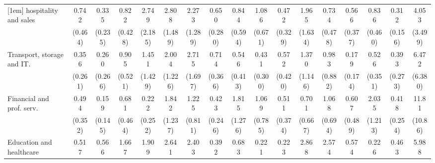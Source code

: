 {\begin{tabular}{l*{16}{c}}
[1em]
hospitality and sales&       0.742         &       0.335         &       0.822         &       2.749         &       2.808         &       2.273         &       0.650         &       0.844         &       1.086         &       0.472         &       1.965         &       0.734         &       0.566         &       0.836         &       0.312\sym{*}  &       4.053         \\
                    &     (0.464)         &     (0.235)         &     (0.428)         &     (2.185)         &     (1.489)         &     (1.289)         &     (0.280)         &     (0.594)         &     (0.671)         &     (0.329)         &     (1.634)         &     (0.478)         &     (0.377)         &     (0.460)         &     (0.156)         &     (3.499)         \\
[1em]
Transport, storage and IT.&       0.356         &       0.260         &       0.905         &       1.451         &       2.004         &       2.715         &       0.714         &       0.546         &       0.431         &       0.572         &       1.370         &       0.983         &       0.179         &       0.526         &       0.393         &       6.472         \\
                    &     (0.261)         &     (0.266)         &     (0.521)         &     (1.429)         &     (1.226)         &     (1.697)         &     (0.366)         &     (0.413)         &     (0.300)         &     (0.420)         &     (1.146)         &     (0.882)         &     (0.174)         &     (0.351)         &     (0.273)         &     (6.380)         \\
[1em]
Financial and prof. serv.&       0.494         &       0.159\sym{*}  &       0.681         &       0.222         &       1.842         &       1.225         &       0.423         &       1.815         &       1.069         &       0.511         &       0.701         &       1.068         &       0.607         &       2.035         &       0.418         &       11.81\sym{**} \\
                    &     (0.352)         &     (0.145)         &     (0.464)         &     (0.252)         &     (1.237)         &     (0.811)         &     (0.246)         &     (1.276)         &     (0.785)         &     (0.374)         &     (0.667)         &     (0.694)         &     (0.489)         &     (1.213)         &     (0.254)         &     (10.86)         \\
[1em]
Education and healthcare&       0.517         &       0.566         &       1.667         &       1.909         &       2.641         &       2.403         &       0.392         &       0.683         &       0.221         &       0.223         &       2.868         &       2.574         &       0.574         &       0.226         &       0.463         &       5.988         \\

\end{tabular}}
